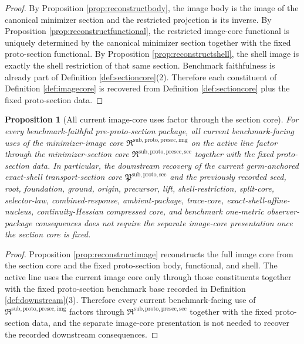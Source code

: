 \documentclass[11pt]{article}
\newcommand{\ProtoSectionCore}{\mathfrak P^{\mathrm{sub,proto,sec}}}
\newcommand{\PreProtoSectionImageCore}{\mathfrak R^{\mathrm{sub,proto,presec,img}}}
\newcommand{\PreProtoSectionMinSectionCore}{\mathfrak R^{\mathrm{sub,proto,presec,sec}}}
\newtheorem{proposition}{Proposition}
\begin{document}
\begin{proof}
By Proposition \ref{prop:reconstructbody}, the image body is the image of the canonical minimizer section and the restricted projection is its inverse. By Proposition \ref{prop:reconstructfunctional}, the restricted image-core functional is uniquely determined by the canonical minimizer section together with the fixed proto-section functional. By Proposition \ref{prop:reconstructshell}, the shell image is exactly the shell restriction of that same section. Benchmark faithfulness is already part of Definition \ref{def:sectioncore}(2). Therefore each constituent of Definition \ref{def:imagecore} is recovered from Definition \ref{def:sectioncore} plus the fixed proto-section data.
\end{proof}

\begin{proposition}[All current image-core uses factor through the section core]
\label{prop:downstream}
For every benchmark-faithful pre-proto-section package, all current benchmark-facing uses of the minimizer-image core \(\PreProtoSectionImageCore\) on the active line factor through the minimizer-section core \(\PreProtoSectionMinSectionCore\) together with the fixed proto-section data. In particular, the downstream recovery of the current germ-anchored exact-shell transport-section core \(\ProtoSectionCore\) and the previously recorded seed, root, foundation, ground, origin, precursor, lift, shell-restriction, split-core, selector-law, combined-response, ambient-package, trace-core, exact-shell-affine-nucleus, continuity-Hessian compressed core, and benchmark one-metric observer-package consequences does not require the separate image-core presentation once the section core is fixed.
\end{proposition}

\begin{proof}
Proposition \ref{prop:reconstructimage} reconstructs the full image core from the section core and the fixed proto-section body, functional, and shell. The active line uses the current image core only through those constituents together with the fixed proto-section benchmark base recorded in Definition \ref{def:downstream}(3). Therefore every current benchmark-facing use of \(\PreProtoSectionImageCore\) factors through \(\PreProtoSectionMinSectionCore\) together with the fixed proto-section data, and the separate image-core presentation is not needed to recover the recorded downstream consequences.
\end{proof}
\end{document}
